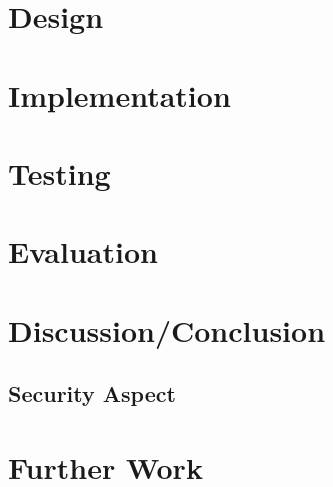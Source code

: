\documentclass{report}
\begin{document}
\chapter{Design}
\chapter{Implementation}
\chapter{Testing}
\chapter{Evaluation}
\chapter{Discussion/Conclusion}
\section{Security Aspect}
\chapter{Further Work}




\end{document}

